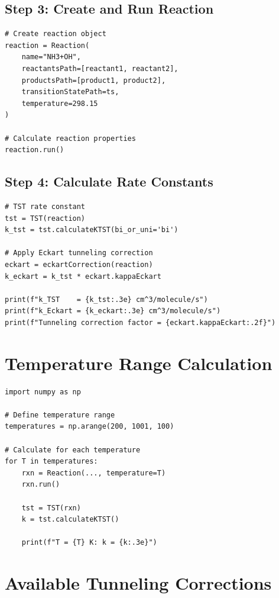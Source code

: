 \documentclass[11pt,a4paper]{article}
\begin{document}
\subsection{Step 3: Create and Run Reaction}

\begin{lstlisting}
# Create reaction object
reaction = Reaction(
    name="NH3+OH",
    reactantsPath=[reactant1, reactant2],
    productsPath=[product1, product2],
    transitionStatePath=ts,
    temperature=298.15
)

# Calculate reaction properties
reaction.run()
\end{lstlisting}

\subsection{Step 4: Calculate Rate Constants}

\begin{lstlisting}
# TST rate constant
tst = TST(reaction)
k_tst = tst.calculateKTST(bi_or_uni='bi')

# Apply Eckart tunneling correction
eckart = eckartCorrection(reaction)
k_eckart = k_tst * eckart.kappaEckart

print(f"k_TST    = {k_tst:.3e} cm^3/molecule/s")
print(f"k_Eckart = {k_eckart:.3e} cm^3/molecule/s")
print(f"Tunneling correction factor = {eckart.kappaEckart:.2f}")
\end{lstlisting}

\section{Temperature Range Calculation}

\begin{lstlisting}
import numpy as np

# Define temperature range
temperatures = np.arange(200, 1001, 100)

# Calculate for each temperature
for T in temperatures:
    rxn = Reaction(..., temperature=T)
    rxn.run()
    
    tst = TST(rxn)
    k = tst.calculateKTST()
    
    print(f"T = {T} K: k = {k:.3e}")
\end{lstlisting}

\section{Available Tunneling Corrections}
\end{document}

